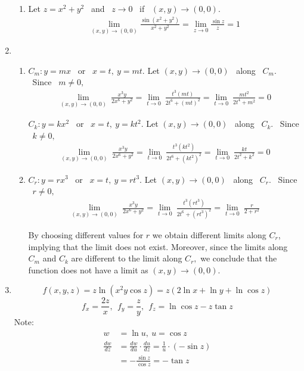 \documentclass[12pt]{amsart}
\begin{document}
\begin{enumerate}
\begin{enumerate}
			\item Let $z=x^2+y^2$ \ and \ $z \rightarrow 0$ \ if \ $(x,y) \rightarrow (0,0)$.
				\begin{align*}
					\lim_{(x,y)\rightarrow(0,0)} \frac{\sin(x^2+y^2)}{x^2+y^2} = \lim_{z \rightarrow 0} \frac{\sin z}{z} = 1
				\end{align*}
		
		\end{enumerate}
		
		\medskip
					
	\item
		
		\begin{enumerate}
		
			\item $C_m: y=mx$ \ or \ $x=t, \  y=mt$. Let $(x,y) \rightarrow (0,0)$ \ along \ $C_m.$ \ Since \ $m \ne 0,$
				\begin{align*}
					\lim_{(x,y)\rightarrow(0,0)} \ \frac{x^3y}{2x^6+y^2} = \lim_{t\rightarrow 0} \ \frac{t^3(mt)}{2t^6+(mt)^2} = \lim_{t\rightarrow 0} \ \frac{mt^2}{2t^4+m^2}=0
				\end{align*}
				
				$C_k: y=kx^2$ \ or \ $x=t, \ y=kt^2$. Let $(x,y) \rightarrow (0,0)$ \ along \ $C_k.$ \ Since \ $k \ne 0,$
				\begin{align*}
					\lim_{(x,y)\rightarrow(0,0)} \ \frac{x^3y}{2x^6+y^2} = \lim_{t\rightarrow 0} \ \frac{t^3(kt^2)}{2t^6+(kt^2)^2} = \lim_{t\rightarrow 0} \ \frac{kt}{2t^2+k^2}=0
				\end{align*}
									
			\item $C_r: y=rx^3$ \ or \ $x=t, \ y=rt^3$. Let $(x,y) \rightarrow (0,0)$ \ along \ $C_r.$  \ Since \ $r \ne 0,$
				\begin{align*}
					\lim_{(x,y)\rightarrow(0,0)} \ \frac{x^3y}{2x^6+y^2} = \lim_{t\rightarrow 0} \ \frac{t^3(rt^3)}{2t^6+(rt^3)^2} = \lim_{t\rightarrow 0} \ \frac{r}{2+r^2}
				\end{align*}
				
				By choosing different values for $r$ we obtain different limits along $C_r$, implying that the limit does not exist. Moreover, since the limits along $C_m$ and $C_k$ are different to the limit along $C_r,$ we conclude that the function does not have a limit as $(x,y) \rightarrow (0,0)$.
			
		\end{enumerate}
		
	\item $$f(x,y,z)=z\ln(x^2y\cos z) = z(2\ln x+\ln y+\ln \cos z)$$
		$$f_x=\dfrac{2z}{x}, \ \ f_y=\dfrac{z}{y}, \ \ f_z=\ln \cos z-z\tan z$$ 
		Note:
			\begin{align*}
				w&=\ln u, \ u=\cos z \\
				\frac{dw}{dz}&=\frac{dw}{du}\cdot\frac{du}{dz}=\frac{1}{u}\cdot(-\sin z) \\
				&=-\frac{\sin z}{\cos z}=-\tan z
			\end{align*}
			

\end{enumerate}
\end{document}
